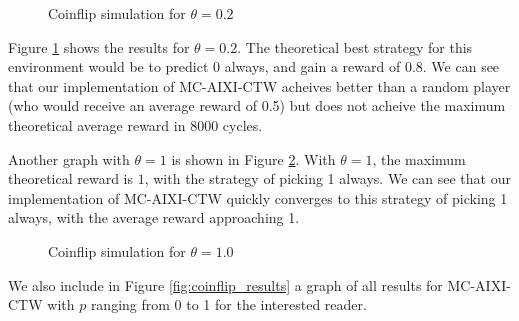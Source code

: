 \documentclass[pdftex,twoside,a4paper]{report}
\newcommand{\mac}{MC-AIXI-CTW}
\begin{document}
\begin{figure}[h]
\centering
\caption{Coinflip simulation for $\theta=0.2$}
\label{fig:coin_0_2}
\end{figure}
	
Figure \ref{fig:coin_0_2} shows the results for $\theta=0.2$. The theoretical best strategy for this environment would be to predict $0$ always, and gain a reward of $0.8$. We can see that our implementation of \mac{} acheives better than a random player (who would receive an average reward of 0.5) but does not acheive the maximum theoretical average reward in 8000 cycles.

Another graph with $\theta = 1$ is shown in Figure \ref{fig:coin_1_0}. With $\theta = 1$, the maximum theoretical reward is $1$, with the strategy of picking 1 always. We can see that our implementation of \mac{} quickly converges to this strategy of picking 1 always, with the average reward approaching 1.
\begin{figure}
\centering
\caption{Coinflip simulation for $\theta=1.0$}
\label{fig:coin_1_0}
\end{figure}

We also include in Figure \ref{fig:coinflip_results} a graph of all results for \mac{} with $p$ ranging from 0 to 1 for the interested reader.

\end{document}
